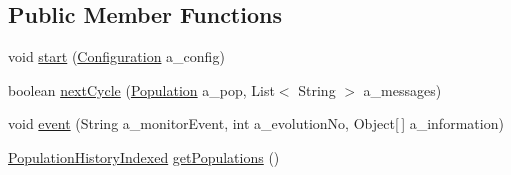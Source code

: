 \subsection*{Public Member Functions}
\begin{DoxyCompactItemize}
\item 
void \hyperlink{interfaceorg_1_1jgap_1_1audit_1_1_i_evolution_monitor_a4352de2b8b067f78d8a4befcd6bf6593}{start} (\hyperlink{classorg_1_1jgap_1_1_configuration}{Configuration} a\-\_\-config)
\item 
boolean \hyperlink{interfaceorg_1_1jgap_1_1audit_1_1_i_evolution_monitor_a564db6ed7124c706e5828c3ef1e1be82}{next\-Cycle} (\hyperlink{classorg_1_1jgap_1_1_population}{Population} a\-\_\-pop, List$<$ String $>$ a\-\_\-messages)
\item 
void \hyperlink{interfaceorg_1_1jgap_1_1audit_1_1_i_evolution_monitor_a0358692771cccc5f0affe4ae2ac17869}{event} (String a\-\_\-monitor\-Event, int a\-\_\-evolution\-No, Object\mbox{[}$\,$\mbox{]} a\-\_\-information)
\item 
\hyperlink{classorg_1_1jgap_1_1eval_1_1_population_history_indexed}{Population\-History\-Indexed} \hyperlink{interfaceorg_1_1jgap_1_1audit_1_1_i_evolution_monitor_a1e5a15cbea7eb8277b70db7e8318bc6d}{get\-Populations} ()
\end{DoxyCompactItemize}
